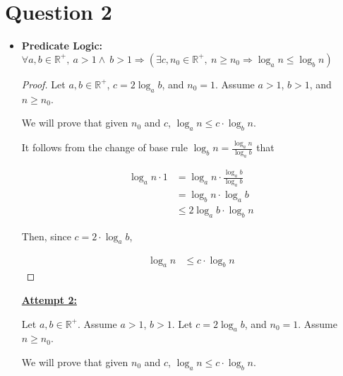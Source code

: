 \documentclass[12pt]{article}
\begin{document}
\section*{Question 2}
\begin{itemize}
    \item

    \textbf{Predicate Logic:} $\forall a,b \in \mathbb{R}^{+},\:a > 1 \land \:b > 1
    \Rightarrow (\exists c, n_0 \in \mathbb{R}^{+},\:n \geq n_0 \Rightarrow \log_a n \leq \log_b n)$

    \begin{proof}

        Let $a,b \in \mathbb{R}^{+}$, $c = 2 \log_a b$, and $n_0 = 1$. Assume $a > 1$,
        $b > 1$, and $n \geq n_0$.

        \bigskip

        We will prove that given $n_0$ and $c$, $\log_a n \leq c \cdot \log_b n$.

        \bigskip

        It follows from the change of base rule $\log_b n = \frac{\log_a n}{\log_a b}$
        that

        \setcounter{equation}{0}
        \begin{align}
            \log_a n \cdot 1 &= \log_a n \cdot \frac{\log_a b}{\log_a b}\\
            &= \log_b n \cdot \log_a b\\
            &\leq 2 \log_a b \cdot \log_b n
        \end{align}

        \bigskip

        Then, since $c = 2 \cdot \log_a b$,

        \begin{align}
            \log_a n &\leq c \cdot \log_b n
        \end{align}

    \end{proof}

    \bigskip

    \begin{mdframed}
        \underline{\textbf{Attempt 2:}}

        \bigskip

        Let $a,b \in \mathbb{R}^{+}$. \color{red} Assume $a > 1$, $b > 1$.
        Let $c = 2 \log_a b$, and $n_0 = 1$. Assume $n \geq n_0$\color{black}.

        \bigskip

        We will prove that given $n_0$ and $c$, $\log_a n \leq c \cdot \log_b n$.


\end{mdframed}
\end{itemize}
\end{document}
